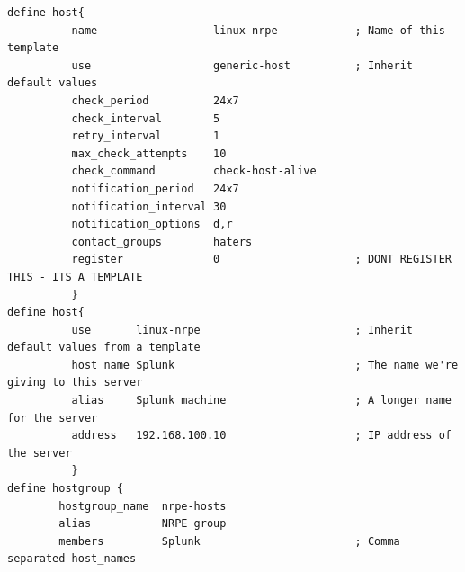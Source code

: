 \documentclass[10pt,a4paper,final]{report}
\begin{document}
\begin{lstlisting}
define host{
          name                  linux-nrpe            ; Name of this template
          use                   generic-host          ; Inherit default values
          check_period          24x7
          check_interval        5
          retry_interval        1
          max_check_attempts    10
          check_command         check-host-alive
          notification_period   24x7
          notification_interval 30
          notification_options  d,r
          contact_groups        haters
          register              0                     ; DONT REGISTER THIS - ITS A TEMPLATE
          }
define host{
          use       linux-nrpe                        ; Inherit default values from a template
          host_name Splunk                            ; The name we're giving to this server
          alias     Splunk machine                    ; A longer name for the server
          address   192.168.100.10                    ; IP address of the server
          }
define hostgroup {
        hostgroup_name  nrpe-hosts
        alias           NRPE group
        members         Splunk                        ; Comma separated host_names


\end{lstlisting}
\end{document}
